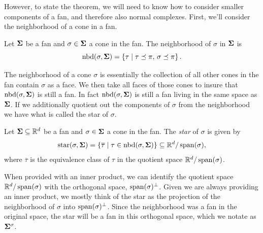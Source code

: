 \documentclass[12pt,oneside]{../../sfsuthesis}
\begin{document}
However, to state the theorem, we will need to know how to consider smaller components of a fan, and therefore also normal complexes.
First, we'll consider the neighborhood of a cone in a fan.
\begin{definition}[Neighborhood]\th\label{def:nbr}
    Let \( \bm{\Sigma} \) be a fan and \( \sigma \in \bm{\Sigma} \) a cone in the fan.
    The neighborhood of \( \sigma \) in \( \bm{\Sigma} \) is
    \[
        \operatorname{nbd}(\sigma, \bm{\Sigma}) = \left\{ \tau \; \middle| \; \tau \preceq \pi, \, \sigma \preceq \pi \right\}.
    \]
\end{definition}
The neighborhood of a cone \( \sigma \) is essentially the collection of all other cones in the fan contain \( \sigma \) as a face.
We then take all faces of those cones to insure that \( \operatorname{nbd}(\sigma, \bm{\Sigma}) \) is still a fan.
In fact \( \operatorname{nbd}(\sigma, \bm{\Sigma}) \) is still a fan living in the same space as \( \bm{\Sigma} \).
If we additionally quotient out the components of \( \sigma \) from the neighborhood we have what is called the star of \( \sigma \).
\begin{definition}[Star]\th\label{def:star}
    Let \( \bm{\Sigma} \subseteq \mathbb{R}^d\) be a fan and \( \sigma \in \bm{\Sigma} \) a cone in the fan.
    The \emph{star} of \( \sigma \) is given by
    \[
        \operatorname{star}(\sigma, \bm{\Sigma}) = \left\{ \overline{\tau} \; \middle| \; \tau \in \operatorname{nbd}(\sigma, \bm{\Sigma}) \right\} \subseteq \mathbb{R}^d / \operatorname{span}(\sigma),
    \]
    where \( \overline{\tau} \) is the equivalence class of \( \tau \) in the quotient space \( \mathbb{R}^d / \operatorname{span}(\sigma) \).
\end{definition}
When provided with an inner product, we can identify the quotient space \( \mathbb{R}^d / \operatorname{span}(\sigma)\) with the orthogonal space, \( \operatorname{span}(\sigma)^\bot \).
Given we are always providing an inner product, we mostly think of the star as the projection of the neighborhood of \( \sigma \) into \( \operatorname{span}(\sigma)^\bot \).
Since the neighborhood was a fan in the original space, the star will be a fan in this orthogonal space, which we notate as  \( \bm{\Sigma}^{\sigma} \).
\end{document}
